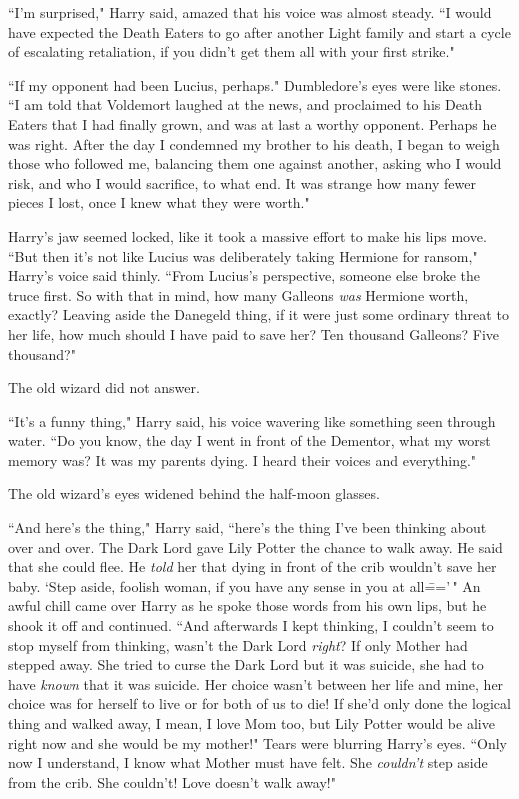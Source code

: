 ``I'm surprised," Harry said, amazed that his voice was almost steady. ``I would have expected the Death Eaters to go after another Light family and start a cycle of escalating retaliation, if you didn't get them all with your first strike."

``If my opponent had been Lucius, perhaps." Dumbledore's eyes were like stones. ``I am told that Voldemort laughed at the news, and proclaimed to his Death Eaters that I had finally grown, and was at last a worthy opponent. Perhaps he was right. After the day I condemned my brother to his death, I began to weigh those who followed me, balancing them one against another, asking who I would risk, and who I would sacrifice, to what end. It was strange how many fewer pieces I lost, once I knew what they were worth."

Harry's jaw seemed locked, like it took a massive effort to make his lips move. ``But then it's not like Lucius was deliberately taking Hermione for ransom," Harry's voice said thinly. ``From Lucius's perspective, someone else broke the truce first. So with that in mind, how many Galleons \emph{was} Hermione worth, exactly? Leaving aside the Danegeld thing, if it were just some ordinary threat to her life, how much should I have paid to save her? Ten thousand Galleons? Five thousand?"

The old wizard did not answer.

``It's a funny thing," Harry said, his voice wavering like something seen through water. ``Do you know, the day I went in front of the Dementor, what my worst memory was? It was my parents dying. I heard their voices and everything."

The old wizard's eyes widened behind the half-moon glasses.

``And here's the thing," Harry said, ``here's the thing I've been thinking about over and over. The Dark Lord gave Lily Potter the chance to walk away. He said that she could flee. He \emph{told} her that dying in front of the crib wouldn't save her baby. `Step aside, foolish woman, if you have any sense in you at all\==='\," An awful chill came over Harry as he spoke those words from his own lips, but he shook it off and continued. ``And afterwards I kept thinking, I couldn't seem to stop myself from thinking, wasn't the Dark Lord \emph{right}? If only Mother had stepped away. She tried to curse the Dark Lord but it was suicide, she had to have \emph{known} that it was suicide. Her choice wasn't between her life and mine, her choice was for herself to live or for both of us to die! If she'd only done the logical thing and walked away, I mean, I love Mom too, but Lily Potter would be alive right now and she would be my mother!" Tears were blurring Harry's eyes. ``Only now I understand, I know what Mother must have felt. She \emph{couldn't} step aside from the crib. She couldn't! Love doesn't walk away!"

